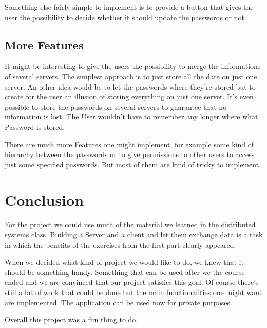 \documentclass{report}
\begin{document}
Something else fairly simple to implement is to provide a button that gives the user the possibility to decide whether it should update the passwords or not.  

\subsection{More Features}
It might be interesting to give the users the possibility to merge the informations of several servers. The simplest approach is to just store all the date on just one server. An other idea would be to let the passwords where they're stored but to create for the user an illusion of storing everything on just one server. It's even possible to store the passwords on several servers to guarantee that no information is lost. The User wouldn't have to remember any longer where what Password is stored.

There are much more Features one might implement, for example some kind of hierarchy between the passwords or to give permissions to other users to access just some specified passwords. But most of them are kind of tricky to implement.

\section{Conclusion}
For the project we could use much of the material we learned in the distributed systems class. Building a Server and a client and let them exchange data is a task in which the benefits of the exercises from the first part clearly appeared. 

When we decided what kind of project we would like to do, we knew that it should be something handy. Something that can be used after we the course ended and we are convinced that our project satisfies this goal. Of course there's still a lot of work that could be done but the main functionalities one might want are implemented. The application can be used now for private purposes.

Overall this project was a fun thing to do. 



\end{document}
